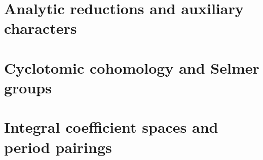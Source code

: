 \begin{abstract}
The decisive compatible arithmetic estimate remains unproved. In particular,
geometric core lower-slope estimates, normalized global theta
identities, orbital-energy bounds, auxiliary-level divisibility, and the remaining Selmer components
must still be assembled with compatible constants. Each conditional result
retains its stated hypotheses. A fixed zero-free region is never substituted
for the critical line. The exposition is arranged by mathematical subject;
the detailed arguments and alternative proofs are retained in separate
sections so that each dependency can be examined on its own.
\end{abstract}
\setcounter{tocdepth}{1}
\hypersetup{bookmarksdepth=2}
\begingroup\small\setlength{\parskip}{0pt}
\tableofcontents
\endgroup
\clearpage

\part{Analytic reductions and auxiliary characters}








\part{Cyclotomic cohomology and Selmer groups}














\part{Integral coefficient spaces and period pairings}














